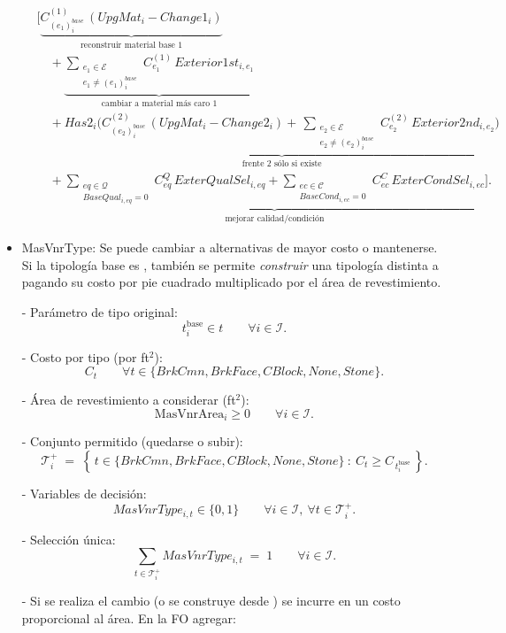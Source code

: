 \begin{itemize}
\[
\begin{aligned}
& \Bigg[
\underbrace{C^{(1)}_{(e_1)^{base}_i}\, (UpgMat_i - Change1_i)}_{\text{reconstruir material base 1}}\\[4pt]
&\quad
+\underbrace{\sum_{\substack{e_1\in\mathcal{E}\\ e_1\neq (e_1)^{base}_i}}
C^{(1)}_{e_1}\, Exterior1st_{i,e_1}}_{\text{cambiar a material más caro 1}}\\[6pt]
&\quad
+\underbrace{Has2_i\Big(
C^{(2)}_{(e_2)^{base}_i}\, (UpgMat_i - Change2_i)
+\,
\sum_{\substack{e_2\in\mathcal{E}\\ e_2\neq (e_2)^{base}_i}}
C^{(2)}_{e_2}\, Exterior2nd_{i,e_2}
\Big)}_{\text{frente 2 sólo si existe}}\\[6pt]
&\quad
+\underbrace{\sum_{\substack{eq\in\mathcal{Q}\\ BaseQual_{i,eq}=0}} C^{Q}_{eq}\, ExterQualSel_{i,eq}
+\sum_{\substack{ec\in\mathcal{C}\\ BaseCond_{i,ec}=0}} C^{C}_{ec}\, ExterCondSel_{i,ec}}_{\text{mejorar calidad/condición}}
\Bigg].
\end{aligned}
\]

    \item MasVnrType: Se puede cambiar a alternativas de mayor costo o mantenerse. Si la tipología base es , también se permite \emph{construir} una tipología distinta a  pagando su costo por pie cuadrado multiplicado por el área de revestimiento.


- Parámetro de tipo original:
\[
  t_i^{\text{base}} \in t \qquad \forall i \in \mathcal{I}.
\]

- Costo por tipo (por ft$^2$):
\[
  C_t \qquad \forall t \in \{BrkCmn, BrkFace, CBlock, None, Stone\}.
\]

- Área de revestimiento a considerar (ft$^2$):
\[
  \mathrm{MasVnrArea}_i \ge 0 \qquad \forall i \in \mathcal{I}.
\]

- Conjunto permitido (quedarse o subir):
\[
  \mathcal{T}^+_i \;=\; \left\{\, t \in \{BrkCmn, BrkFace, CBlock, None, Stone\} \ :\ C_t \ge C_{\,t_i^{\text{base}}} \,\right\}.
\]

- Variables de decisión:
\[
  MasVnrType_{i,t} \in \{0,1\} \qquad \forall i \in \mathcal{I},\ \forall t \in \mathcal{T}^+_i.
\]

- Selección única:
\[
  \sum_{t \in \mathcal{T}^+_i} MasVnrType_{i,t} \;=\; 1
  \qquad \forall i \in \mathcal{I}.
\]

- Si se realiza el cambio (o se construye desde ) se incurre en un costo proporcional al área. En la FO agregar:


\end{itemize}
